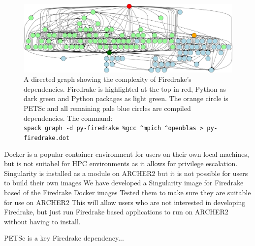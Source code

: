\documentclass[a4paper,11pt]{article}
\begin{document}
\begin{figure}[htp]
	\centering
	\includegraphics[width=\textwidth]{firedrake_deps.png}
	\caption{A directed graph showing the complexity of Firedrake's dependencies. Firedrake is highlighted at the top in red, Python as dark green and Python packages as light green. The orange circle is PETSc and all remaining pale blue circles are compiled dependencies. The command:\\ \texttt{spack graph -d py-firedrake \%gcc \^{}mpich \^{}openblas \textgreater{} py-firedrake.dot}}
	\label{fig:fddeps}
\end{figure}

Docker is a popular container environment for users on their own local machines, but is not suitabel for HPC environments as it allows for privilege escalation.
Singularity is installed as a module on ARCHER2 but it is not possible for users to build their own images
We have developed a Singularity image for Firedrake based of the Firedrake Docker images
Tested them to make sure they are suitable for use on ARCHER2
This will allow users who are not interested in developing Firedrake, but just run Firedrake based applications to run on ARCHER2 without having to install.

PETSc is a key Firedrake dependency...
\end{document}
